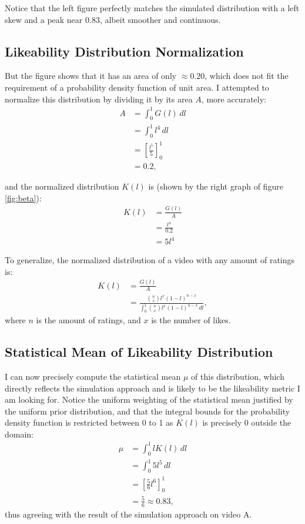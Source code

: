 \documentclass[a4paper,11pt]{article}
\newcommand*\Eval[3]{\left[#1\right]_{#3}^{#2}}
\begin{document}
Notice that the left figure perfectly matches the simulated distribution with a left skew and a peak near $0.83$, albeit smoother and continuous.

\subsection{Likeability Distribution Normalization}
But the figure shows that it has an area of only $\approx 0.20$, which does not fit the requirement of a probability density function of unit area. I attempted to normalize this distribution by dividing it by its area $A$, more accurately:
\begin{align*}
    A &= \int_{0}^{1} G(l) \, dl\\
    &= \int_{0}^{1} l^4 \, dl\\
    &= \Eval{\frac{l^5}{5}}{1}{0}\\
    &= 0.2,
\end{align*}

and the normalized distribution $K(l)$ is (shown by the right graph of figure \ref{fig:beta}):
\begin{align*}
    K(l) &= \frac{G(l)}{A}\\
    &= \frac{l^4}{0.2}\\
    &= 5l^4
\end{align*}

To generalize, the normalized distribution of a video with any amount of ratings is:
\begin{align*}
    K(l) &= \frac{G(l)}{A}\\
     &= \frac{ {n \choose x} l^x (1-l)^{n-x}} {\int_{0}^{1} {n \choose x} l^x (1-l)^{n-x} \, dl},
\end{align*}
where $n$ is the amount of ratings, and $x$ is the number of likes.

\subsection{Statistical Mean of Likeability Distribution}
I can now precisely compute the statistical mean $\mu$ of this distribution, which directly reflects the simulation approach and is likely to be the likeability metric I am looking for. Notice the uniform weighting of the statistical mean justified by the uniform prior distribution, and that the integral bounds for the probability density function is restricted between 0 to 1 as $K(l)$ is precisely $0$ outside the domain:
\begin{align*}
    \mu &= \int_{0}^{1} l K(l) \, dl\\
    &= \int_{0}^{1} 5l^5 \, dl\\
    &= \Eval{\frac{5}{6} l^6}{1}{0}\\
    &= \frac{5}{6} \approx 0.83,
\end{align*}
thus agreeing with the result of the simulation approach on video A.
\end{document}
